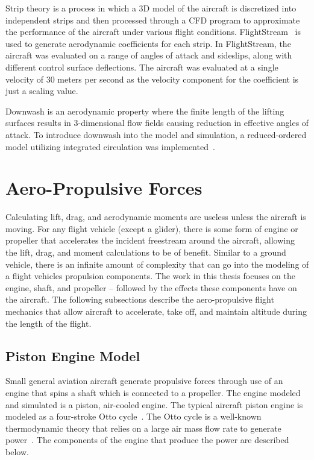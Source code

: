 Strip theory is a process in which a 3D model of the aircraft is discretized into independent strips and then processed through a CFD program to approximate the performance of the aircraft under various flight conditions. FlightStream~\cite{FlightStream} is used to generate aerodynamic coefficients for each strip. In FlightStream, the aircraft was evaluated on a range of angles of attack and sideslips, along with different control surface deflections. The aircraft was evaluated at a single velocity of 30 meters per second as the velocity component for the coefficient is just a scaling value.

Downwash is an aerodynamic property where the finite length of the lifting surfaces results in 3-dimensional flow fields causing reduction in effective angles of attack. To introduce downwash into the model and simulation, a reduced-ordered model utilizing integrated circulation was implemented~\cite{ahujaIntegratedComputationalAeroacoustics2022,bhandariGeneticAlgorithmOptimization2023}\@.

\section{Aero-Propulsive Forces}

Calculating lift, drag, and aerodynamic moments are useless unless the aircraft is moving. For any flight vehicle (except a glider), there is some form of engine or propeller that accelerates the incident freestream around the aircraft, allowing the lift, drag, and moment calculations to be of benefit. Similar to a ground vehicle, there is an infinite amount of complexity that can go into the modeling of a flight vehicles propulsion components. The work in this thesis focuses on the engine, shaft, and propeller {--} followed by the effects these components have on the aircraft. The following subsections describe the aero-propulsive flight mechanics that allow aircraft to accelerate, take off, and maintain altitude during the length of the flight.

\subsection{Piston Engine Model}
Small general aviation aircraft generate propulsive forces through use of an engine that spins a shaft which is connected to a propeller. The engine modeled and simulated is a piston, air-cooled engine. The typical aircraft piston engine is modeled as a four-stroke Otto cycle~\cite{raymerAircraftDesignConceptual2018}. The Otto cycle is a well-known thermodynamic theory that relies on a large air mass flow rate to generate power~\cite{gudmundssonGeneralAviationAircraft2014}. The components of the engine that produce the power are described below.


